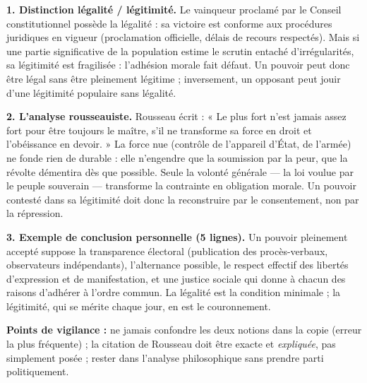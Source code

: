 \documentclass[11pt]{article}
\newcommand{\cle}[1]{{\popxbold\color{popdark}#1}}
\begin{document}
\begin{corrige}

\textbf{1. Distinction légalité / légitimité.} Le vainqueur proclamé par le Conseil constitutionnel possède la \cle{légalité} : sa victoire est conforme aux procédures juridiques en vigueur (proclamation officielle, délais de recours respectés). Mais si une partie significative de la population estime le scrutin entaché d'irrégularités, sa \cle{légitimité} est fragilisée : l'adhésion morale fait défaut. Un pouvoir peut donc être légal sans être pleinement légitime ; inversement, un opposant peut jouir d'une légitimité populaire sans légalité.

\textbf{2. L'analyse rousseauiste.} Rousseau écrit : « Le plus fort n'est jamais assez fort pour être toujours le maître, s'il ne transforme sa force en droit et l'obéissance en devoir. » La force nue (contrôle de l'appareil d'État, de l'armée) ne fonde rien de durable : elle n'engendre que la soumission par la peur, que la révolte démentira dès que possible. Seule la \cle{volonté générale} — la loi voulue par le peuple souverain — transforme la contrainte en obligation morale. Un pouvoir contesté dans sa légitimité doit donc la reconstruire par le consentement, non par la répression.

\textbf{3. Exemple de conclusion personnelle (5 lignes).} Un pouvoir pleinement accepté suppose la transparence électoral (publication des procès-verbaux, observateurs indépendants), l'alternance possible, le respect effectif des libertés d'expression et de manifestation, et une justice sociale qui donne à chacun des raisons d'adhérer à l'ordre commun. La légalité est la condition minimale ; la légitimité, qui se mérite chaque jour, en est le couronnement.

\textbf{Points de vigilance :} ne jamais confondre les deux notions dans la copie (erreur la plus fréquente) ; la citation de Rousseau doit être exacte et \emph{expliquée}, pas simplement posée ; rester dans l'analyse philosophique sans prendre parti politiquement.

\end{corrige}
\end{document}
